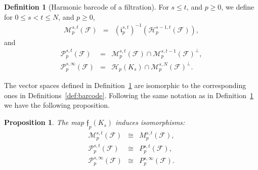 \documentclass[11pt]{amsart}
\theoremstyle{theorem}
\newtheorem{proposition}{Proposition}[section]
\theoremstyle{remark}
\theoremstyle{definition}
\newtheorem{definition}{Definition}[section]
\begin{document}
\begin{definition}[Harmonic barcode of a filtration]
\label{def:harmonic-barcode}
For $s \leq t$, and $p \geq 0$, we define
for
$0 \leq s < t \leq N$, 
and $p \geq 0$,
\begin{eqnarray*}
\mathcal{M}^{s,t}_p(\mathcal{F}) &=& (\mathfrak{i}^{s,t}_p)^{-1}(\mathcal{H}^{s-1,t}_p(\mathcal{F})), 
\end{eqnarray*}
and 
\begin{eqnarray*}
\mathcal{P}^{s,t}_p(\mathcal{F}) &=& %
\mathcal{M}^{s,t}_p(\mathcal{F})\cap\mathcal{M}^{s,t-1}_p(\mathcal{F})^\perp,\\ 
\mathcal{P}^{s,\infty}_p(\mathcal{F}) &=&  
\mathcal{H}_p(K_s) \cap \mathcal{M}^{s,N}_p(\mathcal{F})^\perp.
\end{eqnarray*}
\end{definition}

The vector spaces defined in Definition~\ref{def:harmonic-barcode} are isomorphic to
the corresponding ones in Definitions~\ref{def:barcode}.
Following the same notation as in Definition~\ref{def:harmonic-barcode} we have the 
following proposition.

\begin{proposition}
\label{prop:harmonic-barcode}
The map $\mathfrak{f}_p(K_s)$ induces isomorphisms:
\begin{eqnarray*}
\label{eqn:prop:harmonic-barcode:1}
\mathcal{M}^{s,t}_p(\mathcal{F}) &\cong & {M}^{s,t}_p(\mathcal{F}), \\ 
\label{eqn:prop:harmonic-barcode:3}
\mathcal{P}^{s,t}_p(\mathcal{F}) &\cong& {P}^{s,t}_p(\mathcal{F}), \\
\label{eqn:prop:harmonic-barcode:4}
\mathcal{P}^{s,\infty}_p(\mathcal{F}) &\cong&  {P}^{s,\infty}_p(\mathcal{F}).
\end{eqnarray*}
\end{proposition}
\end{document}
